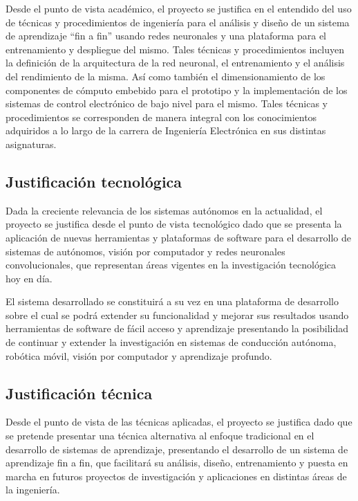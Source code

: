 \documentclass[12pt,letterpaper]{article}
\begin{document}
Desde el punto de vista académico, el proyecto se justifica en el entendido del uso de técnicas y procedimientos 
de ingeniería para el análisis y diseño de un sistema de aprendizaje “fin a fin” usando redes neuronales y una plataforma 
para el entrenamiento y despliegue del mismo. Tales técnicas y procedimientos incluyen la definición de 
la arquitectura de la red neuronal, el entrenamiento y el análisis del rendimiento de la misma. Así como 
también el dimensionamiento de los componentes de cómputo embebido para el prototipo y la implementación de 
los sistemas de control electrónico de bajo nivel para el mismo. Tales técnicas y 
procedimientos se corresponden de manera integral con los conocimientos adquiridos a lo largo de la carrera 
de Ingeniería Electrónica en sus distintas asignaturas.

\subsection{Justificación tecnológica}

Dada la creciente relevancia de los sistemas autónomos en la actualidad, el proyecto se justifica 
desde el punto de vista tecnológico dado que se presenta la aplicación de nuevas
herramientas y plataformas de software para el desarrollo de sistemas de autónomos, visión por computador 
y redes neuronales convolucionales, que representan áreas vigentes en la investigación tecnológica hoy en día.

El sistema desarrollado se constituirá a su vez en una plataforma de desarrollo sobre el cual se podrá 
extender su funcionalidad y mejorar sus resultados usando herramientas de software de fácil acceso y aprendizaje 
presentando la posibilidad de continuar y extender la investigación en sistemas de conducción autónoma, robótica móvil, 
visión por computador y aprendizaje profundo.

\subsection{Justificación técnica}

Desde el punto de vista de las técnicas aplicadas, el proyecto se justifica dado que se pretende presentar una técnica 
alternativa al enfoque tradicional en el desarrollo de sistemas de aprendizaje, presentando el desarrollo de un sistema 
de aprendizaje fin a fin, que facilitará su análisis, diseño, entrenamiento y puesta en marcha en futuros proyectos 
de investigación y aplicaciones en distintas áreas de la ingeniería. 
\end{document}
